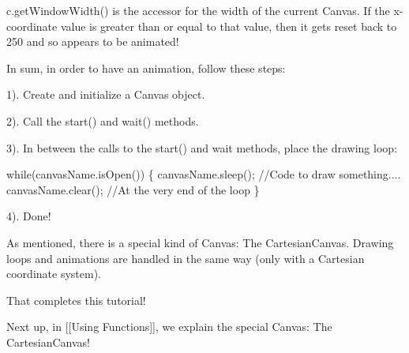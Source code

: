 c.\+get\+Window\+Width() is the accessor for the width of the current Canvas. If the x-\/coordinate value is greater than or equal to that value, then it gets reset back to 250 and so appears to be animated!

In sum, in order to have an animation, follow these steps\+:

1). Create and initialize a Canvas object.

2). Call the start() and wait() methods.

3). In between the calls to the start() and wait methods, place the drawing loop\+: 
\begin{DoxyCode}
\textcolor{keywordflow}{while}(canvasName.isOpen()) \{
  canvasName.sleep();
  \textcolor{comment}{//Code to draw something....}
  canvasName.clear(); \textcolor{comment}{//At the very end of the loop}
\}
\end{DoxyCode}


4). Done!

As mentioned, there is a special kind of Canvas\+: The Cartesian\+Canvas. Drawing loops and animations are handled in the same way (only with a Cartesian coordinate system).

That completes this tutorial!

Next up, in \mbox{[}\mbox{[}Using Functions\mbox{]}\mbox{]}, we explain the special Canvas\+: The Cartesian\+Canvas! 